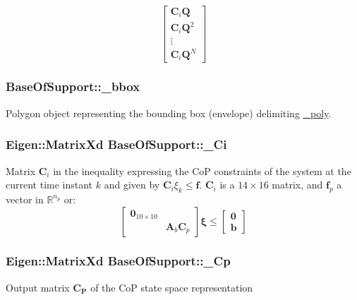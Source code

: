 \[ \left[\begin{array}{c} \mathbf{C}_i\mathbf{Q}\\ \mathbf{C}_i\mathbf{Q}^2\\ \vdots\\ \mathbf{C}_i\mathbf{Q}^N \end{array}\right] \] \hypertarget{classBaseOfSupport_a8af13ff0086dc08252d49f69b1752033}{
\subsubsection[{\-\_\-bbox}]{ {\bf \-Base\-Of\-Support\-::\-\_\-bbox}}}\label{classBaseOfSupport_a8af13ff0086dc08252d49f69b1752033}
\-Polygon object representing the bounding box (envelope) delimiting \hyperlink{classBaseOfSupport_a7e9b4ef515f90e2a7012871e7287bf5e}{\-\_\-poly}. \hypertarget{classBaseOfSupport_a0a7a51d0d278841633e4b291df96065d}{
\subsubsection[{\-\_\-\-Ci}]{\setlength{\rightskip}{0pt plus 5cm}\-Eigen\-::\-Matrix\-Xd {\bf \-Base\-Of\-Support\-::\-\_\-\-Ci}}}\label{classBaseOfSupport_a0a7a51d0d278841633e4b291df96065d}
\-Matrix $\mathbf{C}_i$ in the inequality expressing the \-Co\-P constraints of the system at the current time instant $k$ and given by $\mathbf{C}_i \xi_k \leq \mathbf{f}$. $\mathbf{C}_i$ is a $14 \times 16$ matrix, and $\mathbf{f}_p$ a vector in $\mathbb{R}^{n_p}$ or\-: \[ \left[\begin{array}{cc} \mathbf{0}_{10\times10} & \\ & \mathbf{A}_b \mathbf{C}_p \end{array}\right] \mathbf{\xi} \leq \left[\begin{array}{c} \mathbf{0} \\ \mathbf{b} \end{array}\right] \] \hypertarget{classBaseOfSupport_a0ff0fd44966f86d5a62e4d38c3cfea60}{
\subsubsection[{\-\_\-\-Cp}]{\setlength{\rightskip}{0pt plus 5cm}\-Eigen\-::\-Matrix\-Xd {\bf \-Base\-Of\-Support\-::\-\_\-\-Cp}}}\label{classBaseOfSupport_a0ff0fd44966f86d5a62e4d38c3cfea60}
\-Output matrix $\mathbf{C_P}$ of the \-Co\-P state space representation

